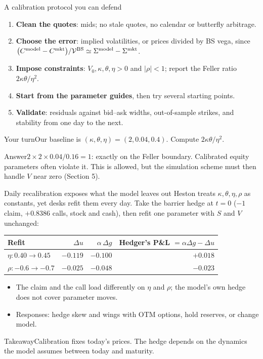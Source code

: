 \documentclass[handout,10pt,t,aspectratio=169]{beamer}
\newenvironment{pausebox}{\begin{block}{Your turn}}{\end{block}}
\newenvironment{answerbox}{\begin{exampleblock}{Answer}}{\end{exampleblock}}
\newenvironment{keybox}{\begin{exampleblock}{Takeaway}}{\end{exampleblock}}
\begin{document}
\begin{frame}{A calibration protocol you can defend}
\small
\begin{enumerate}
\item \textbf{Clean the quotes}: mids; no stale quotes, no calendar or butterfly arbitrage.
\item \textbf{Choose the error}: implied volatilities, or prices divided by BS vega, since
\(\bigl(C^{\rm model}-C^{\rm mkt}\bigr)/\mathcal V^{\rm BS}\simeq\Sigma^{\rm model}-\Sigma^{\rm mkt}\).
\item \textbf{Impose constraints}: \(V_0,\kappa,\theta,\eta>0\) and \(|\rho|<1\);
report the Feller ratio \(2\kappa\theta/\eta^2\).
\item \textbf{Start from the parameter guides}, then try several starting points.
\item \textbf{Validate}: residuals against bid--ask widths, out-of-sample strikes,
and stability from one day to the next.
\end{enumerate}
\begin{pausebox}Our baseline is \((\kappa,\theta,\eta)=(2,0.04,0.4)\). Compute \(2\kappa\theta/\eta^2\).\end{pausebox}
\begin{answerbox}\(2\times2\times0.04/0.16=1\): exactly on the Feller boundary.
Calibrated equity parameters often violate it. This is allowed, but the simulation
scheme must then handle \(V\) near zero (Section 5).\end{answerbox}
\end{frame}

\begin{frame}{Daily recalibration exposes what the model leaves out}
\small
Heston treats \(\kappa,\theta,\eta,\rho\) as constants, yet desks refit them every day.
Take the barrier hedge at \(t=0\) (\(-1\) claim, \(+0.8386\) calls, stock and cash),
then refit one parameter with \(S\) and \(V\) unchanged:
\begin{center}
\begin{tabular}{lrrr}
\toprule Refit & \(\Delta u\) & \(\alpha\,\Delta g\) & Hedger's P\&L \(=\alpha\Delta g-\Delta u\)\\\midrule
\(\eta\colon0.40\to0.45\) & \(-0.119\) & \(-0.100\) & \(+0.018\)\\
\(\rho\colon-0.6\to-0.7\) & \(-0.025\) & \(-0.048\) & \(-0.023\)\\\bottomrule
\end{tabular}
\end{center}
\begin{itemize}
\item The claim and the call load differently on \(\eta\) and \(\rho\); the model's
own hedge does not cover parameter moves.
\item Responses: hedge skew and wings with OTM options, hold reserves, or change model.
\end{itemize}
\begin{keybox}Calibration fixes today's prices. The hedge depends on the dynamics the
model assumes between today and maturity.\end{keybox}
\end{frame}
\end{document}
